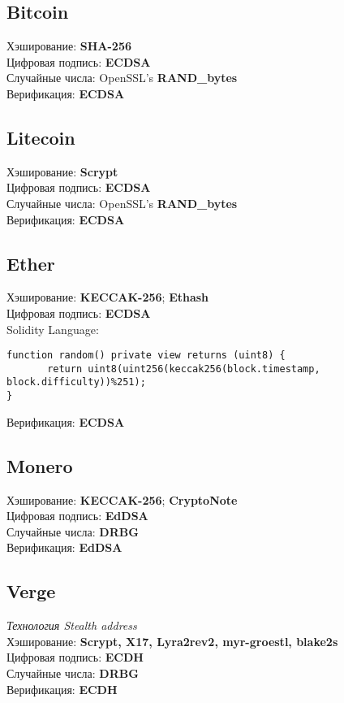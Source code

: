 \documentclass[russian, a4paper, 12pt]{article}
\begin{document}
\subsection{Bitcoin}
Хэширование: \textbf{SHA-256}\\
Цифровая подпись: \textbf{ECDSA}\\
Случайные числа: OpenSSL's \textbf{RAND\_bytes}\\
Верификация: \textbf{ECDSA}\\

\subsection{Litecoin}
Хэширование: \textbf{Scrypt}\\
Цифровая подпись: \textbf{ECDSA}\\
Случайные числа: OpenSSL's \textbf{RAND\_bytes}\\
Верификация: \textbf{ECDSA}\\

\subsection{Ether}
Хэширование: \textbf{KECCAK-256}; \textbf{Ethash}\\
Цифровая подпись: \textbf{ECDSA}\\
Solidity Language:
\begin{verbatim}
function random() private view returns (uint8) {
       return uint8(uint256(keccak256(block.timestamp, block.difficulty))%251);
}
\end{verbatim}
Верификация: \textbf{ECDSA}\\

\subsection{Monero}
Хэширование: \textbf{KECCAK-256}; \textbf{CryptoNote}\\
Цифровая подпись: \textbf{EdDSA}\\
Случайные числа: \textbf{DRBG}\\
Верификация: \textbf{EdDSA}\\

\subsection{Verge}
\textit{Технология Stealth address}\\
Хэширование: \textbf{Scrypt, X17, Lyra2rev2, myr-groestl, blake2s}\\
Цифровая подпись: \textbf{ECDH}\\
Случайные числа: \textbf{DRBG}\\
Верификация: \textbf{ECDH}\\
\end{document}

